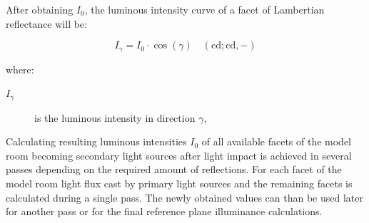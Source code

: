 After obtaining $I_{0}$, the luminous intensity curve of a facet of Lambertian reflectance will be:

\begin{equation}
I_{\gamma}=I_{0} \cdot \cos(\gamma) \quad \mathrm{(cd;cd,-)}
\label{eq:Igamma}
\end{equation}

where:
\begin{description}
	\item[$I_{\gamma}$] is the luminous intensity in direction $\gamma$,
\end{description}

Calculating resulting luminous intensities $I_{0}$ of all available facets of the model room becoming secondary light sources after light impact is achieved in several passes depending on the required amount of reflections. For each facet of the model room light flux cast by primary light sources and the remaining facets is calculated during a single pass. The newly obtained values can than be used later for another pass or for the final reference plane illuminance calculations.

%
